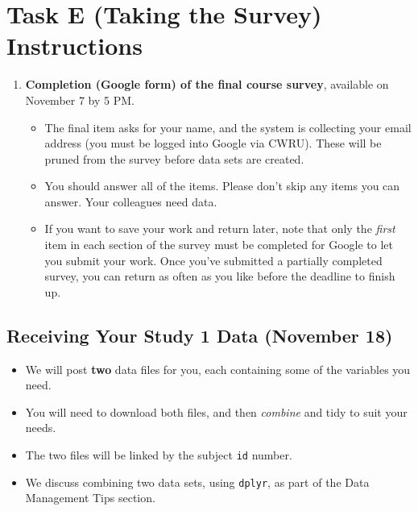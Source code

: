 \documentclass[]{book}
\providecommand{\tightlist}{%
  \setlength{\itemsep}{0pt}\setlength{\parskip}{0pt}}
\theoremstyle{definition}
\theoremstyle{definition}
\theoremstyle{definition}
\theoremstyle{remark}
\begin{document}
\hypertarget{task-e-taking-the-survey-instructions}{%
\chapter{Task E (Taking the Survey)
Instructions}\label{task-e-taking-the-survey-instructions}}

\begin{enumerate}
\def\labelenumi{\arabic{enumi}.}
\setcounter{enumi}{1}
\tightlist
\item
  \textbf{Completion (Google form) of the final course survey},
  available on November 7 by 5 PM.

  \begin{itemize}
  \tightlist
  \item
    The final item asks for your name, and the system is collecting your
    email address (you must be logged into Google via CWRU). These will
    be pruned from the survey before data sets are created.
  \item
    You should answer all of the items. Please don't skip any items you
    can answer. Your colleagues need data.
  \item
    If you want to save your work and return later, note that only the
    \emph{first} item in each section of the survey must be completed
    for Google to let you submit your work. Once you've submitted a
    partially completed survey, you can return as often as you like
    before the deadline to finish up.
  \end{itemize}
\end{enumerate}

\hypertarget{receiving-your-study-1-data-november-18}{%
\section{Receiving Your Study 1 Data (November
18)}\label{receiving-your-study-1-data-november-18}}

\begin{itemize}
\tightlist
\item
  We will post \textbf{two} data files for you, each containing some of
  the variables you need.
\item
  You will need to download both files, and then \emph{combine} and tidy
  to suit your needs.
\item
  The two files will be linked by the subject \texttt{id} number.
\item
  We discuss combining two data sets, using \texttt{dplyr}, as part of
  the Data Management Tips section.
\end{itemize}
\end{document}
